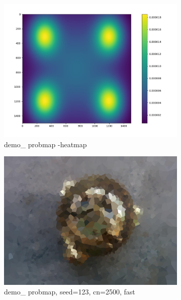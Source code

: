 \documentclass[15pt]{article}
\begin{document}
\begin{figure}
\centering
\begin{subfigure}[b]{0.48\linewidth}
\includegraphics[width=\linewidth]{demo_probmap.jpg}
\caption{demo\_ probmap -heatmap}
\end{subfigure}
\begin{subfigure}[b]{0.48\linewidth}
\includegraphics[width=\linewidth]{probmap_2500_f_seed123.jpg}
\caption{demo\_ probmap, seed=123, cn=2500, fast}
\end{subfigure}
\begin{subfigure}[b]{0.48\linewidth}

\end{subfigure}
\end{figure}
\end{document}
